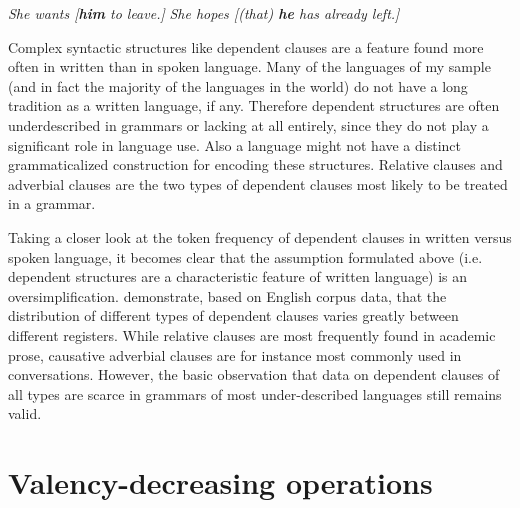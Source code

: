 \begin{exe}\ex\label{EngComp}
\begin{xlist}
\ex \textit{She wants  {\rm[}\textbf{him} to leave.{\rm]}}
\ex \textit{She hopes  {\rm[}(that) \textbf{he} has already left.{\rm]}}
\end{xlist}
\end{exe}

Complex syntactic structures like dependent clauses are a feature found more often in written than in spoken language. 
Many of the languages of my sample (and in fact the majority of the languages in the world) do not have a long tradition as a written language, if any. 
Therefore dependent structures are often underdescribed in grammars or lacking at all entirely, since they do not play a significant role in language use. 
Also a language might not have a distinct grammaticalized construction for encoding these structures. %
Relative clauses and adverbial clauses are the two types of dependent clauses most likely to be treated in a grammar. 

Taking a closer look at the token frequency of dependent clauses in written versus spoken language, it becomes clear that the assumption formulated above (i.e. dependent structures are a characteristic feature of written language) is an oversimplification. 
\citet[139--141]{Biber:1998} demonstrate, based on English corpus data, that the distribution of different types of dependent clauses varies greatly between different registers. 
While relative clauses are most frequently found in academic prose, causative adverbial clauses are for instance most commonly used in conversations. 
However, the basic observation that data on dependent clauses of all types are scarce in grammars of most under-described languages still remains valid.

\section{Valency-decreasing operations}\label{ValDec}

